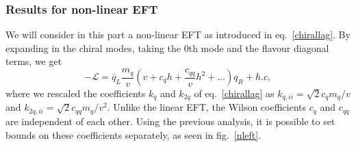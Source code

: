 \subsubsection{Results for non-linear EFT}
We will consider in this part a non-linear EFT as introduced in eq.~\eqref{chirallag}. By expanding in the chiral modes, taking the 0th mode and the flavour diagonal terms, we get
\begin{equation}
	-\mathcal L = \bar q_{L} \frac{m_q}{v} \left( v + c_{q}h + \frac{c_{qq}}{v} h^2 + \dots \right) q_R + h.c,
\end{equation}
where we rescaled the coefficients $k_{q}$ and $k_{2q}$ of eq.~\eqref{chirallag} as  $ k_{q,ii} =\sqrt{2}  c_{q} m_q/v $ and $ k_{2q,ii} =\sqrt{2}  c_{qq}m_q/v^2 $.  Unlike the linear EFT, the Wilson coefficients $c_{q}$ and $ c_{qq}$ are independent of each other. Using the previous analysis,  it is possible to set bounds on these coefficients separately, as seen in fig.~\ref{nleft}.
